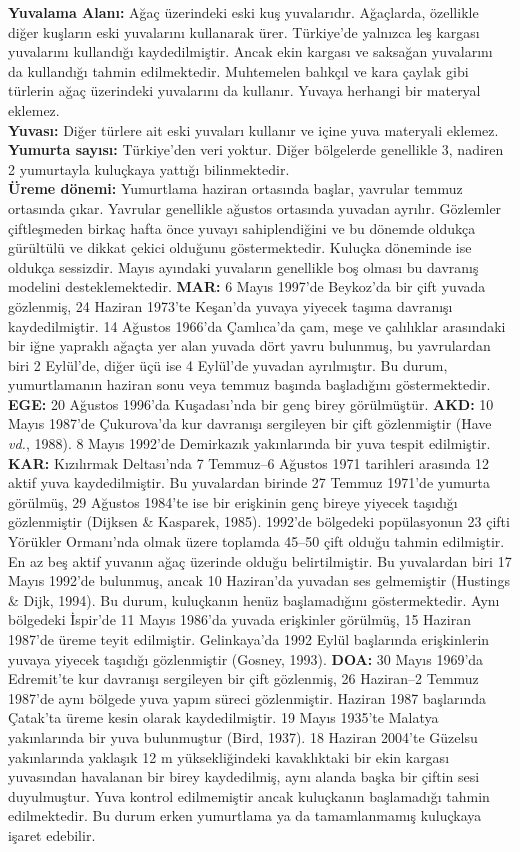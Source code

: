 \documentclass[
  10.5pt,
  a4paper,
  DIV=11,
  numbers=noendperiod,
  twocolumn]{scrreprt}
\begin{document}
\textbf{Yuvalama Alanı:} Ağaç üzerindeki eski kuş yuvalarıdır.
Ağaçlarda, özellikle diğer kuşların eski yuvalarını kullanarak ürer.
Türkiye'de yalnızca leş kargası yuvalarını kullandığı kaydedilmiştir.
Ancak ekin kargası ve saksağan yuvalarını da kullandığı tahmin
edilmektedir. Muhtemelen balıkçıl ve kara çaylak gibi türlerin ağaç
üzerindeki yuvalarını da kullanır. Yuvaya herhangi bir materyal
eklemez.\\
\textbf{Yuvası:} Diğer türlere ait eski yuvaları kullanır ve içine yuva
materyali eklemez.\\
\textbf{Yumurta sayısı:} Türkiye'den veri yoktur. Diğer bölgelerde
genellikle 3, nadiren 2 yumurtayla kuluçkaya yattığı bilinmektedir.\\
\textbf{Üreme dönemi:} Yumurtlama haziran ortasında başlar, yavrular
temmuz ortasında çıkar. Yavrular genellikle ağustos ortasında yuvadan
ayrılır. Gözlemler çiftleşmeden birkaç hafta önce yuvayı sahiplendiğini
ve bu dönemde oldukça gürültülü ve dikkat çekici olduğunu
göstermektedir. Kuluçka döneminde ise oldukça sessizdir. Mayıs ayındaki
yuvaların genellikle boş olması bu davranış modelini desteklemektedir.
\textbf{MAR:} 6 Mayıs 1997'de Beykoz'da bir çift yuvada gözlenmiş, 24
Haziran 1973'te Keşan'da yuvaya yiyecek taşıma davranışı kaydedilmiştir.
14 Ağustos 1966'da Çamlıca'da çam, meşe ve çalılıklar arasındaki bir
iğne yapraklı ağaçta yer alan yuvada dört yavru bulunmuş, bu yavrulardan
biri 2 Eylül'de, diğer üçü ise 4 Eylül'de yuvadan ayrılmıştır. Bu durum,
yumurtlamanın haziran sonu veya temmuz başında başladığını
göstermektedir. \textbf{EGE:} 20 Ağustos 1996'da Kuşadası'nda bir genç
birey görülmüştür. \textbf{AKD:} 10 Mayıs 1987'de Çukurova'da kur
davranışı sergileyen bir çift gözlenmiştir (Have \emph{vd.}, 1988). 8
Mayıs 1992'de Demirkazık yakınlarında bir yuva tespit edilmiştir.
\textbf{KAR:} Kızılırmak Deltası'nda 7 Temmuz--6 Ağustos 1971 tarihleri
arasında 12 aktif yuva kaydedilmiştir. Bu yuvalardan birinde 27 Temmuz
1971'de yumurta görülmüş, 29 Ağustos 1984'te ise bir erişkinin genç
bireye yiyecek taşıdığı gözlenmiştir (Dijksen \& Kasparek, 1985).
1992'de bölgedeki popülasyonun 23 çifti Yörükler Ormanı'nda olmak üzere
toplamda 45--50 çift olduğu tahmin edilmiştir. En az beş aktif yuvanın
ağaç üzerinde olduğu belirtilmiştir. Bu yuvalardan biri 17 Mayıs 1992'de
bulunmuş, ancak 10 Haziran'da yuvadan ses gelmemiştir (Hustings \& Dijk,
1994). Bu durum, kuluçkanın henüz başlamadığını göstermektedir. Aynı
bölgedeki İspir'de 11 Mayıs 1986'da yuvada erişkinler görülmüş, 15
Haziran 1987'de üreme teyit edilmiştir. Gelinkaya'da 1992 Eylül
başlarında erişkinlerin yuvaya yiyecek taşıdığı gözlenmiştir (Gosney,
1993). \textbf{DOA:} 30 Mayıs 1969'da Edremit'te kur davranışı
sergileyen bir çift gözlenmiş, 26 Haziran--2 Temmuz 1987'de aynı bölgede
yuva yapım süreci gözlenmiştir. Haziran 1987 başlarında Çatak'ta üreme
kesin olarak kaydedilmiştir. 19 Mayıs 1935'te Malatya yakınlarında bir
yuva bulunmuştur (Bird, 1937). 18 Haziran 2004'te Güzelsu yakınlarında
yaklaşık 12 m yüksekliğindeki kavaklıktaki bir ekin kargası yuvasından
havalanan bir birey kaydedilmiş, aynı alanda başka bir çiftin sesi
duyulmuştur. Yuva kontrol edilmemiştir ancak kuluçkanın başlamadığı
tahmin edilmektedir. Bu durum erken yumurtlama ya da tamamlanmamış
kuluçkaya işaret edebilir.
\end{document}
